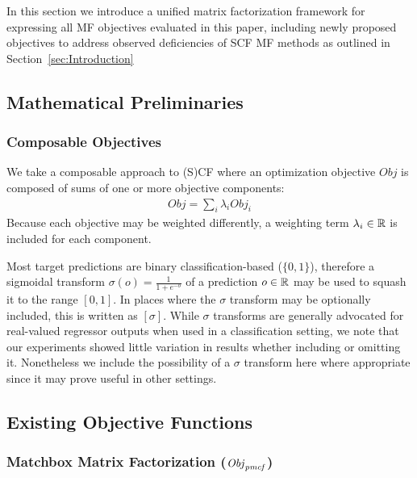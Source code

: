 In this section we introduce a unified matrix factorization framework
for expressing all MF objectives evaluated in this paper, including
newly proposed objectives to address observed deficiencies of SCF
MF methods as outlined in Section~\ref{sec:Introduction}

\subsection{Mathematical Preliminaries}

\subsubsection{Composable Objectives}

We take a composable approach to (S)CF where an optimization objective
$\mathit{Obj}$ is composed of sums of one or more objective
components:
\begin{align}
\mathit{Obj} = \sum_i \lambda_i \mathit{Obj}_i
\end{align}
Because each objective may be weighted differently, a weighting term
$\lambda_i \in \mathbb{R}$ is included for each component.

Most target predictions are binary classification-based ($\{0,1\}$),
therefore a sigmoidal transform $\sigma(o) = \frac{1}{1 + e^{-o}}$ of
a prediction $o \in \mathbb{R}$ may be used to squash it to the range $[0,
1]$.  In places where the $\sigma$ transform may be optionally
included, this is written as $[\sigma]$.  While $\sigma$ transforms 
are generally advocated for real-valued regressor outputs when used in
a classification setting, we note that our experiments
showed little variation in results whether including or omitting it.
Nonetheless we include the possibility of a $\sigma$ transform 
here where appropriate since it may prove useful in other settings.

\subsection{Existing Objective Functions}

\subsubsection{Matchbox Matrix Factorization ($\mathit{Obj}_{\mathit{pmcf}} $)}


